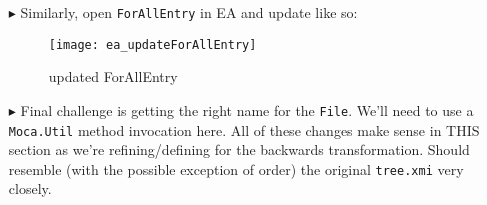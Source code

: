 \begin{itemize}
\item[$\blacktriangleright$] Similarly, open \texttt{ForAllEntry} in EA and update like so:

\begin{figure}[htp]
\begin{center}
  \texttt{[image: ea\_updateForAllEntry]}
  \caption{updated ForAllEntry}
  \label{ea:ForAllEntry_updated}
\end{center}
\end{figure}

\item[$\blacktriangleright$] Final challenge is getting the right name for the \texttt{File}. We'll need to use a \texttt{Moca.Util} method invocation here.
All of these changes make sense in THIS section as we're refining/defining for the backwards transformation. Should resemble (with the possible exception of
order) the original \texttt{tree.xmi} very closely.

\end{itemize}